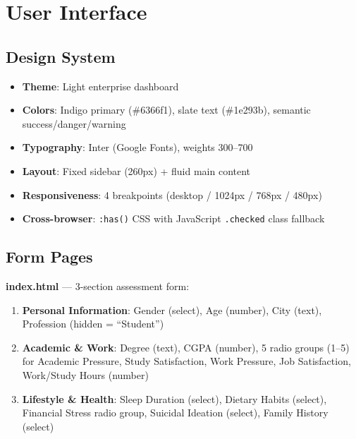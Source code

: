 \documentclass[11pt,a4paper]{article}
\begin{document}
\section{User Interface}

\subsection{Design System}

\begin{itemize}[nosep]
    \item \textbf{Theme}: Light enterprise dashboard
    \item \textbf{Colors}: Indigo primary (\#6366f1), slate text (\#1e293b), semantic success/danger/warning
    \item \textbf{Typography}: Inter (Google Fonts), weights 300--700
    \item \textbf{Layout}: Fixed sidebar (260px) + fluid main content
    \item \textbf{Responsiveness}: 4 breakpoints (desktop / 1024px / 768px / 480px)
    \item \textbf{Cross-browser}: \texttt{:has()} CSS with JavaScript \texttt{.checked} class fallback
\end{itemize}

\subsection{Form Pages}

\textbf{index.html} --- 3-section assessment form:

\begin{enumerate}[nosep]
    \item \textbf{Personal Information}: Gender (select), Age (number), City (text), Profession (hidden = ``Student'')
    \item \textbf{Academic \& Work}: Degree (text), CGPA (number), 5 radio groups (1--5) for Academic Pressure, Study Satisfaction, Work Pressure, Job Satisfaction, Work/Study Hours (number)
    \item \textbf{Lifestyle \& Health}: Sleep Duration (select), Dietary Habits (select), Financial Stress radio group, Suicidal Ideation (select), Family History (select)
\end{enumerate}
\end{document}
